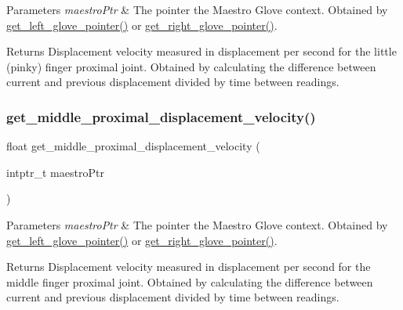 \begin{DoxyParams}{Parameters}
{\em maestro\+Ptr} & The pointer the Maestro Glove context. Obtained by \hyperlink{group__glove_management_ga63ce3c99d4a8b8db851b22af9185764e}{get\+\_\+left\+\_\+glove\+\_\+pointer()} or \hyperlink{group__glove_management_ga9b8fd9d91aeac3f8da50f7a7eba0c32b}{get\+\_\+right\+\_\+glove\+\_\+pointer()}. \\
\hline
\end{DoxyParams}
\begin{DoxyReturn}{Returns}
Displacement velocity measured in displacement per second for the little (pinky) finger proximal joint. Obtained by calculating the difference between current and previous displacement divided by time between readings. 
\end{DoxyReturn}
\mbox{\label{group__velocity_access_ga015bb09a174411f845448f951d4a9000}} 
\subsubsection{\texorpdfstring{get\+\_\+middle\+\_\+proximal\+\_\+displacement\+\_\+velocity()}{get\_middle\_proximal\_displacement\_velocity()}}
{\footnotesize\ttfamily float get\+\_\+middle\+\_\+proximal\+\_\+displacement\+\_\+velocity (\begin{DoxyParamCaption}\item[{intptr\+\_\+t}]{maestro\+Ptr }\end{DoxyParamCaption})}


\begin{DoxyParams}{Parameters}
{\em maestro\+Ptr} & The pointer the Maestro Glove context. Obtained by \hyperlink{group__glove_management_ga63ce3c99d4a8b8db851b22af9185764e}{get\+\_\+left\+\_\+glove\+\_\+pointer()} or \hyperlink{group__glove_management_ga9b8fd9d91aeac3f8da50f7a7eba0c32b}{get\+\_\+right\+\_\+glove\+\_\+pointer()}. \\
\hline
\end{DoxyParams}
\begin{DoxyReturn}{Returns}
Displacement velocity measured in displacement per second for the middle finger proximal joint. Obtained by calculating the difference between current and previous displacement divided by time between readings. 
\end{DoxyReturn}
\mbox{\label{group__velocity_access_ga4077c76793eb77fdde55eff9b5540806}} 
